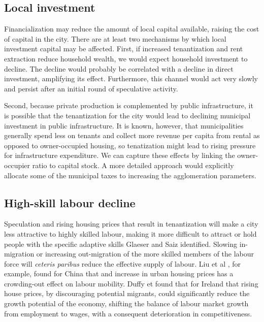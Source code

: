 \subsection{Local investment}

Financialization may reduce the amount of local capital available, raising the cost of capital in the city. 
There are at least two mechanisms by which local investment capital may be affected. First, if increased tenantization and rent extraction reduce household wealth, we would expect household investment to decline. The decline would probably be correlated with a decline in direct investment, amplifying its effect. Furthermore, this channel would act very slowly and persist after an initial round of speculative activity. 

Second, because private production is complemented by public infrastructure, it is possible that the tenantization for the city would lead to declining municipal investment in public infrastructure. It is known, however, that municipalities generally spend less on tenants and collect more revenue per capita from rental as opposed to owner-occupied housing, so tenatization might lead to rising pressure for infrastructure expenditure.  We can capture these effects by linking the owner-occupier ratio to capital stock. A more detailed approach would explicitly allocate some of the municipal taxes to increasing the agglomeration parameters. 




\subsection{High-skill labour decline}

 Speculation and rising housing prices that result in tenantization will make a city less attractive to highly skilled labour, making it more difficult to attract or hold people with the specific adaptive skills Glaeser and Saiz \cite{glaeserRiseSkilledCity2003} identified. Slowing in-migration or increasing out-migration of the more skilled members of the labour force  will \textit{ceteris paribus} reduce the effective supply of labour. 
Liu et al \cite{liuImpactUrbanHousing2023}, for example, found for China that and increase in urban housing prices has a crowding-out effect on labour mobility.  Duffy et  \cite{duffyRisingHousePrices2005} found that for Ireland that rising house prices, by discouraging potential migrants, could significantly reduce the growth potential of the economy, shifting the balance of labour market growth from employment to wages, with a consequent deterioration in competitiveness. %

